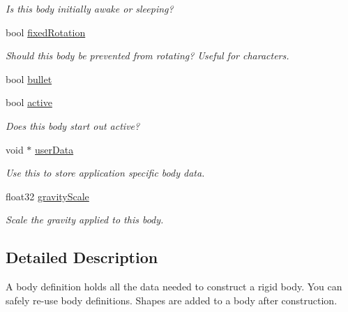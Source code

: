 \begin{DoxyCompactItemize}
\begin{DoxyCompactList}\small\item\em Is this body initially awake or sleeping? \end{DoxyCompactList}\item 
\hypertarget{structb2_body_def_a273a51c57440a8884de5939d76b6e3ea}{bool \hyperlink{structb2_body_def_a273a51c57440a8884de5939d76b6e3ea}{fixed\-Rotation}}\label{structb2_body_def_a273a51c57440a8884de5939d76b6e3ea}

\begin{DoxyCompactList}\small\item\em Should this body be prevented from rotating? Useful for characters. \end{DoxyCompactList}\item 
bool \hyperlink{structb2_body_def_a7c0047c9a98a1d20614eeddcdbce7586}{bullet}
\item 
\hypertarget{structb2_body_def_adf6f3e9a9e124e080c68bc0edeb170df}{bool \hyperlink{structb2_body_def_adf6f3e9a9e124e080c68bc0edeb170df}{active}}\label{structb2_body_def_adf6f3e9a9e124e080c68bc0edeb170df}

\begin{DoxyCompactList}\small\item\em Does this body start out active? \end{DoxyCompactList}\item 
\hypertarget{structb2_body_def_ae457dd1d39be09945eace6061121be29}{void $\ast$ \hyperlink{structb2_body_def_ae457dd1d39be09945eace6061121be29}{user\-Data}}\label{structb2_body_def_ae457dd1d39be09945eace6061121be29}

\begin{DoxyCompactList}\small\item\em Use this to store application specific body data. \end{DoxyCompactList}\item 
\hypertarget{structb2_body_def_aadea3fa173ed1014739ec8b023de4336}{float32 \hyperlink{structb2_body_def_aadea3fa173ed1014739ec8b023de4336}{gravity\-Scale}}\label{structb2_body_def_aadea3fa173ed1014739ec8b023de4336}

\begin{DoxyCompactList}\small\item\em Scale the gravity applied to this body. \end{DoxyCompactList}\end{DoxyCompactItemize}


\subsection{Detailed Description}
A body definition holds all the data needed to construct a rigid body. You can safely re-\/use body definitions. Shapes are added to a body after construction. 

